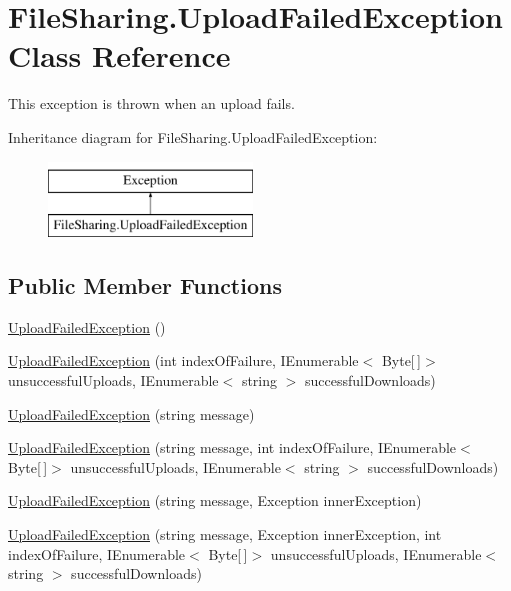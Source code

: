 \hypertarget{class_file_sharing_1_1_upload_failed_exception}{}\section{File\+Sharing.\+Upload\+Failed\+Exception Class Reference}
\label{class_file_sharing_1_1_upload_failed_exception}


This exception is thrown when an upload fails.  


Inheritance diagram for File\+Sharing.\+Upload\+Failed\+Exception\+:\begin{figure}[H]
\begin{center}
\leavevmode
\includegraphics[height=2.000000cm]{class_file_sharing_1_1_upload_failed_exception}
\end{center}
\end{figure}
\subsection*{Public Member Functions}
\begin{DoxyCompactItemize}
\item 
\hyperlink{class_file_sharing_1_1_upload_failed_exception_a695f2b76a11171b4ac7b749eeeb8f09b}{Upload\+Failed\+Exception} ()
\item 
\hyperlink{class_file_sharing_1_1_upload_failed_exception_a70ad5d0f760b1961b322dababb1a105b}{Upload\+Failed\+Exception} (int index\+Of\+Failure, I\+Enumerable$<$ Byte\mbox{[}$\,$\mbox{]}$>$ unsuccessful\+Uploads, I\+Enumerable$<$ string $>$ successful\+Downloads)
\item 
\hyperlink{class_file_sharing_1_1_upload_failed_exception_a9100bff30f30fc075d688f652b69c70e}{Upload\+Failed\+Exception} (string message)
\item 
\hyperlink{class_file_sharing_1_1_upload_failed_exception_aae92894e90378d6f003a25c218285a22}{Upload\+Failed\+Exception} (string message, int index\+Of\+Failure, I\+Enumerable$<$ Byte\mbox{[}$\,$\mbox{]}$>$ unsuccessful\+Uploads, I\+Enumerable$<$ string $>$ successful\+Downloads)
\item 
\hyperlink{class_file_sharing_1_1_upload_failed_exception_ad121124c4e8c37f2b1f686715e903450}{Upload\+Failed\+Exception} (string message, Exception inner\+Exception)
\item 
\hyperlink{class_file_sharing_1_1_upload_failed_exception_a1366a7120744fb9caa67e16e85f2c681}{Upload\+Failed\+Exception} (string message, Exception inner\+Exception, int index\+Of\+Failure, I\+Enumerable$<$ Byte\mbox{[}$\,$\mbox{]}$>$ unsuccessful\+Uploads, I\+Enumerable$<$ string $>$ successful\+Downloads)
\end{DoxyCompactItemize}
